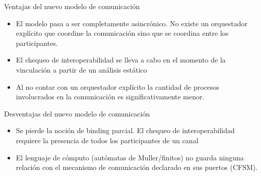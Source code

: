 \documentclass[10pt,xcolor={table,dvipsnames},t]{beamer}
\begin{document}
\begin{frame}{Ventajas del nuevo modelo de comunicación}
 \vspace{\fill}
\begin{itemize}
     \item El modelo pasa a ser completamente asincrónico. No existe un orquestador explícito que coordine la comunicación sino que se coordina entre los participantes.
    \item El chequeo de interoperabilidad se lleva a cabo en el momento de la vinculación a partir de un análisis estático
    \item Al no contar con un orquestador explícito la cantidad de procesos involucrados en la comunicación es significativamente menor.
 \end{itemize}
  \vspace{\fill}
\end{frame}

\begin{frame}{Desventajas del nuevo modelo de comunicación}
 \vspace{\fill}
 \begin{itemize}
    \item Se pierde la noción de binding parcial. El chequeo de interoperabilidad requiere la presencia de todos los participantes de un canal
    \item El lenguaje de cómputo (autómatas de Muller/finitos) no guarda ninguna relación con el mecanismo de comunicación declarado en sus puertos (CFSM).
     \end{itemize}
 \vspace{\fill}
\end{frame}

    
\end{document}
